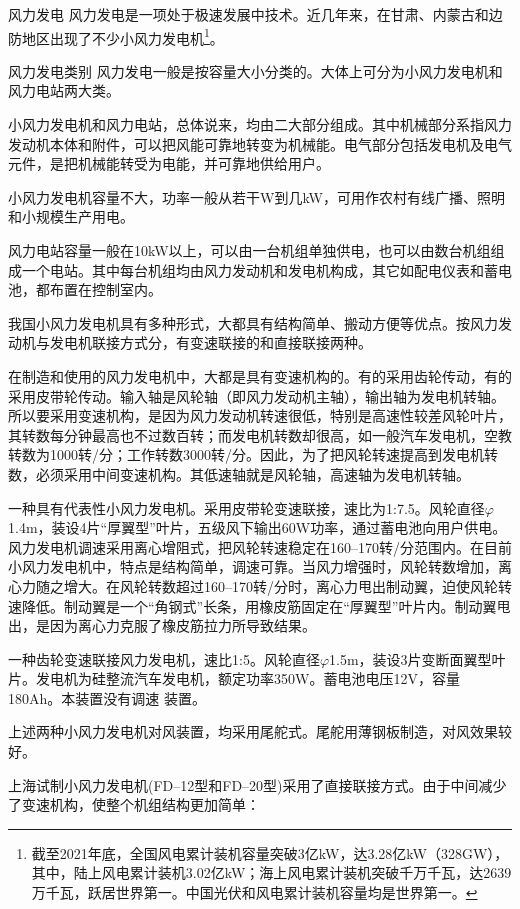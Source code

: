 \documentclass{ctexbook}
\begin{document}
风力发电
风力发电是一项处于极速发展中技术。近几年来，在甘肃、内蒙古和边防地区出现了不少小风力发电机\footnote{截至2021年底，全国风电累计装机容量突破3亿kW，达3.28亿kW（328GW），其中，陆上风电累计装机3.02亿kW；海上风电累计装机突破千万千瓦，达2639万千瓦，跃居世界第一。中国光伏和风电累计装机容量均是世界第一。}。

风力发电类别
风力发电一般是按容量大小分类的。大体上可分为小风力发电机和风力电站两大类。

小风力发电机和风力电站，总体说来，均由二大部分组成。其中机械部分系指风力发动机本体和附件，可以把风能可靠地转变为机械能。电气部分包括发电机及电气元件，是把机械能转受为电能，并可靠地供给用户。

小风力发电机容量不大，功率一般从若干W到几kW，可用作农村有线广播、照明和小规模生产用电。
	
风力电站容量一般在10kW以上，可以由一台机组单独供电，也可以由数台机组组成一个电站。其中每台机组均由风力发动机和发电机构成，其它如配电仪表和蓄电池，都布置在控制室内。

我国小风力发电机具有多种形式，大都具有结构简单、搬动方便等优点。按风力发动机与发电机联接方式分，有变速联接的和直接联接两种。

在制造和使用的风力发电机中，大都是具有变速机构的。有的采用齿轮传动，有的采用皮带轮传动。输入轴是风轮轴（即风力发动机主轴），输出轴为发电机转轴。所以要采用变速机构，是因为风力发动机转速很低，特别是高速性较差风轮叶片，其转数每分钟最高也不过数百转；而发电机转数却很高，如一般汽车发电机，空教转数为1000转/分；工作转数3000转/分。因此，为了把风轮转速提高到发电机转数，必须采用中间变速机构。其低速轴就是风轮轴，高速轴为发电机转轴。

一种具有代表性小风力发电机。采用皮带轮变速联接，速比为1:7.5。风轮直径$\varphi$1.4m，装设4片“厚翼型”叶片，五级风下输出60W功率，通过蓄电池向用户供电。风力发电机调速采用离心增阻式，把风轮转速稳定在160--170转/分范围内。在目前小风力发电机中，特点是结构简单，调速可靠。当风力增强时，风轮转数增加，离心力随之增大。在风轮转数超过160--170转/分时，离心力甩出制动翼，迫使风轮转速降低。制动翼是一个“角钢式”长条，用橡皮筋固定在“厚翼型”叶片内。制动翼甩出，是因为离心力克服了橡皮筋拉力所导致结果。

一种齿轮变速联接风力发电机，速比1:5。风轮直径$\varphi$1.5m，装设3片变断面翼型叶片。发电机为硅整流汽车发电机，额定功率350W。蓄电池电压12V，容量180Ah。本装置没有调速
装置。

上述两种小风力发电机对风装置，均采用尾舵式。尾舵用薄钢板制造，对风效果较好。

上海试制小风力发电机(FD--12型和FD--20型)采用了直接联接方式。由于中间减少了变速机构，使整个机组结构更加简单：
\end{document}
